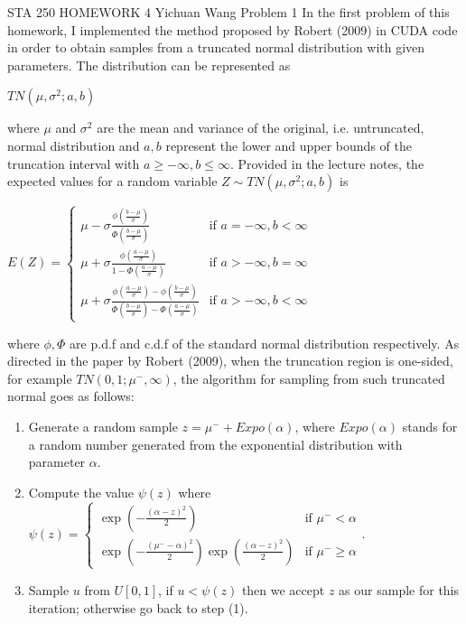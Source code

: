 \documentclass[12pt]{article}
\begin{document}
\noindent STA 250 HOMEWORK 4 \newline Yichuan Wang \newline \newline
Problem 1 \newline \newline
In the first problem of this homework, I implemented the method proposed by Robert (2009) in CUDA code in order to obtain samples from a truncated normal distribution with given parameters. The distribution can be represented as
\begin{center}
	$TN(\mu, \sigma^2; a, b)$
\end{center}
where $\mu$ and $\sigma^2$ are the mean and variance of the original, i.e. untruncated, normal distribution and $a, b$ represent the lower and upper bounds of the truncation interval with $a \geq -\infty, b \leq \infty$. Provided in the lecture notes, the expected values for a random variable $Z \sim TN(\mu, \sigma^2; a, b)$ is
\begin{center}
$E(Z) = \begin{cases}
	\mu - \sigma \frac{\phi(\frac{b-\mu}{\sigma})}{\Phi(\frac{b-\mu}{\sigma})} &\mbox{if }a = -\infty, b < \infty \\
	\mu + \sigma \frac{\phi(\frac{a-\mu}{\sigma})}{1-\Phi(\frac{a-\mu}{\sigma})} &\mbox{if }a > -\infty, b = \infty \\
	\mu + \sigma \frac{\phi(\frac{a-\mu}{\sigma})-\phi(\frac{b-\mu}{\sigma})}{\Phi(\frac{b-\mu}{\sigma})-\Phi(\frac{a-\mu}{\sigma})} &\mbox{if }a > -\infty, b < \infty
\end{cases}$
\end{center}
where $\phi, \Phi$ are p.d.f and c.d.f of the standard normal distribution respectively. \newline
As directed in the paper by Robert (2009), when the truncation region is one-sided, for example $TN(0, 1;\mu^-, \infty)$, the algorithm for sampling from such truncated normal goes as follows:
\begin{enumerate}[(1)]
	\item Generate a random sample $z = \mu^- + Expo(\alpha)$, where $Expo(\alpha)$ stands for a random number generated from the exponential distribution with parameter $\alpha$.
	\item Compute the value $\psi(z)$ where \newline
		$\psi(z) = \begin{cases} \exp(-\frac{(\alpha - z)^2}{2}) &\mbox{if } \mu^- < \alpha \\ \exp(-\frac{(\mu^--\alpha)^2}{2})\exp(\frac{(\alpha-z)^2}{2}) &\mbox{if } \mu^- \geq \alpha \end{cases}$.
	\item Sample $u$ from $U[0,1]$, if $u < \psi(z)$ then we accept $z$ as our sample for this iteration; otherwise go back to step (1).
\end{enumerate}
\end{document}
